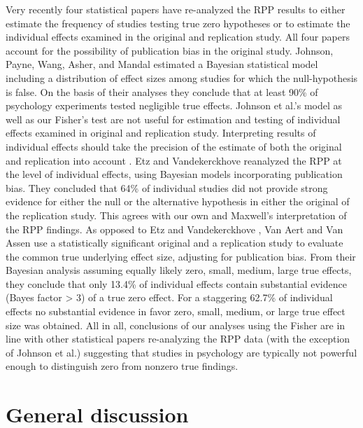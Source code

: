 \documentclass{article}
\begin{document}
Very recently four statistical papers have re-analyzed the RPP results to either estimate the frequency of studies testing true zero hypotheses or to estimate the individual effects examined in the original and replication study. All four papers account for the possibility of publication bias in the original study. Johnson, Payne, Wang, Asher, and Mandal \cite{doi:10.1080/01621459.2016.1240079} estimated a Bayesian statistical model including a distribution of effect sizes among studies for which the null-hypothesis is false. On the basis of their analyses they conclude that at least 90\% of psychology experiments tested negligible true effects. Johnson et al.'s model as well as our Fisher's test are not useful for estimation and testing of individual effects examined in original and replication study. Interpreting results of individual effects should take the precision of the estimate of both the original and replication into account \cite{Cumming2014-fi}. Etz and Vandekerckhove \cite{10.1371/journal.pone.0149794} reanalyzed the RPP at the level of individual effects, using Bayesian models incorporating publication bias. They concluded that 64\% of individual studies did not provide strong evidence for either the null or the alternative hypothesis in either the original of the replication study. This agrees with our own and Maxwell's \cite{Maxwell2015-yb} interpretation of the RPP findings. As opposed to Etz and Vandekerckhove \cite{10.1371/journal.pone.0149794}, Van Aert and Van Assen \cite{rpp-hybrid,rpp-bayes} use a statistically significant original and a replication study to evaluate the common true underlying effect size, adjusting for publication bias. From their Bayesian analysis \cite{rpp-bayes} assuming equally likely zero, small, medium, large true effects, they conclude that only 13.4\% of individual effects contain substantial evidence (Bayes factor > 3) of a true zero effect. For a staggering 62.7\% of individual effects no substantial evidence in favor zero, small, medium, or large true effect size was obtained. All in all, conclusions of our analyses using the Fisher are in line with other statistical papers re-analyzing the RPP data (with the exception of Johnson et al.) suggesting that studies in psychology are typically not powerful enough to distinguish zero from nonzero true findings.

\section*{General discussion}
\end{document}
